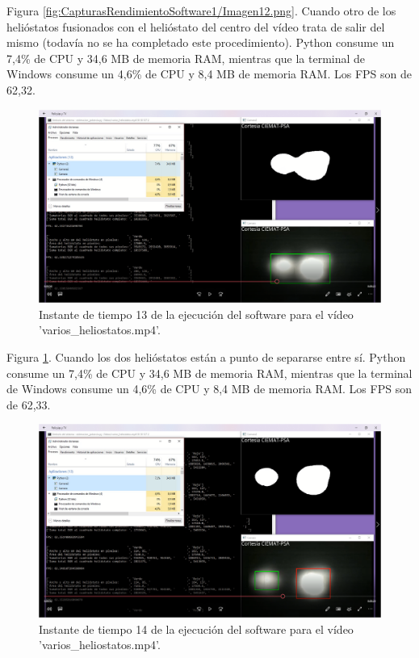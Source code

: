 Figura \ref{fig:CapturasRendimientoSoftware1/Imagen12.png}. Cuando otro de los helióstatos fusionados con el helióstato del centro del vídeo trata de salir del mismo (todavía no se ha completado este procedimiento). Python consume un 7,4\% de CPU y 34,6 MB de memoria RAM, mientras que la terminal de Windows consume un 4,6\% de CPU y 8,4 MB de memoria RAM. Los FPS son de 62,32.\\[20pt]

\begin{figure}[h!]
  	\centering
	\includegraphics[width=\textwidth]{CapturasRendimientoSoftware1/Imagen13.png}
	\caption{Instante de tiempo 13 de la ejecución del software para el vídeo 'varios\_heliostatos.mp4'.
	\label{fig:CapturasRendimientoSoftware1/Imagen13.png}}
\end{figure}

Figura \ref{fig:CapturasRendimientoSoftware1/Imagen13.png}. Cuando los dos helióstatos están a punto de separarse entre sí. Python consume un 7,4\% de CPU y 34,6 MB de memoria RAM, mientras que la terminal de Windows consume un 4,6\% de CPU y 8,4 MB de memoria RAM. Los FPS son de 62,33.\\[20pt]

\begin{figure}[h!]
  	\centering
	\includegraphics[width=\textwidth]{CapturasRendimientoSoftware1/Imagen14.png}
	\caption{Instante de tiempo 14 de la ejecución del software para el vídeo 'varios\_heliostatos.mp4'.
	\label{fig:CapturasRendimientoSoftware1/Imagen14.png}}
\end{figure}

